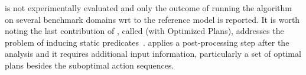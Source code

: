 \LOCMtwo is not experimentally evaluated and only the outcome of running the \LOCMtwo algorithm on several benchmark domains wrt to the reference model is reported. It is worth noting the last contribution of \LOCM, called \textbf{\LOP} (\LOCM with Optimized Plans), addresses the problem of inducing static predicates~\cite{GregoryC16}. \LOP applies a post-processing step after the \LOCM analysis and it requires additional input information, particularly a set of optimal plans besides the suboptimal \FO action sequences.
 






